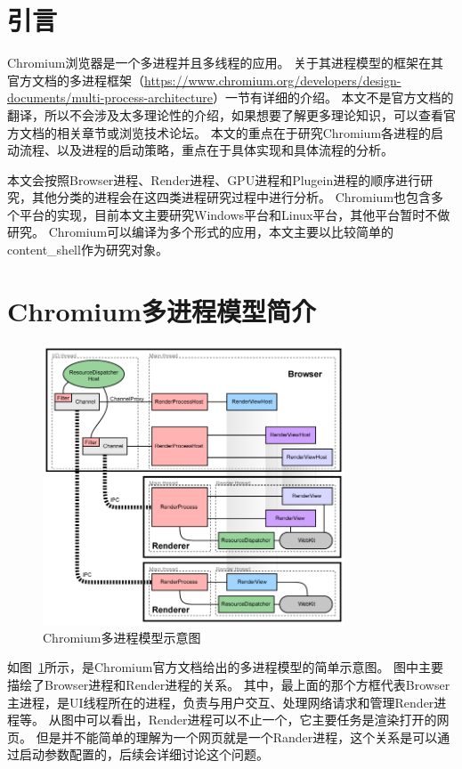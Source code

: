 
\section{引言}
Chromium浏览器是一个多进程并且多线程的应用。
关于其进程模型的框架在其官方文档的多进程框架（\url{https://www.chromium.org/developers/design-documents/multi-process-architecture}）一节有详细的介绍。
本文不是官方文档的翻译，所以不会涉及太多理论性的介绍，如果想要了解更多理论知识，可以查看官方文档的相关章节或浏览技术论坛。
本文的重点在于研究Chromium各进程的启动流程、以及进程的启动策略，重点在于具体实现和具体流程的分析。

本文会按照Browser进程、Render进程、GPU进程和Plugein进程的顺序进行研究，其他分类的进程会在这四类进程研究过程中进行分析。
Chromium也包含多个平台的实现，目前本文主要研究Windows平台和Linux平台，其他平台暂时不做研究。
Chromium可以编译为多个形式的应用，本文主要以比较简单的content\_shell作为研究对象。

\section{Chromium多进程模型简介}

\begin{figure}[H] 
  \centering 
  \includegraphics[width=0.80\textwidth]{image/process_study/multi_process_architecture.png} 
  \caption{Chromium多进程模型示意图} \label{fig:multi_process_architecture} 
\end{figure}

如图~\ref{fig:multi_process_architecture}所示，是Chromium官方文档给出的多进程模型的简单示意图。
图中主要描绘了Browser进程和Render进程的关系。
其中，最上面的那个方框代表Browser主进程，是UI线程所在的进程，负责与用户交互、处理网络请求和管理Render进程等。
从图中可以看出，Render进程可以不止一个，它主要任务是渲染打开的网页。
但是并不能简单的理解为一个网页就是一个Rander进程，这个关系是可以通过启动参数配置的，后续会详细讨论这个问题。

